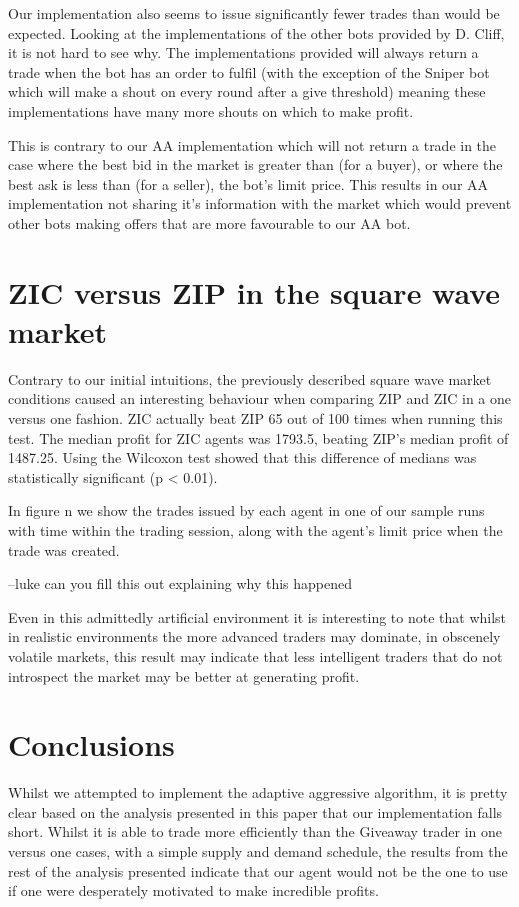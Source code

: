 \documentclass{acm_proc_article-sp}
\begin{document}
Our implementation also seems to issue significantly fewer trades than would be
expected. Looking at the implementations of the other bots provided by D.
Cliff, it is not hard to see why. The implementations provided will always
return a trade when the bot has an order to fulfil (with the exception of the
Sniper bot which will make a shout on every round after a give threshold)
meaning these implementations have many more shouts on which to make profit.

This is contrary to our AA implementation which will not return a trade in the
case where the best bid in the market is greater than (for a buyer), or where
the best ask is less than (for a seller), the bot's limit price. This results
in our AA implementation not sharing it's information with the market which
would prevent other bots making offers that are more favourable to our AA bot.

\section{ZIC versus ZIP in the square wave market}

Contrary to our initial intuitions, the previously described square wave market
conditions caused an interesting behaviour when comparing ZIP and ZIC in a one
versus one fashion. ZIC actually beat ZIP 65 out of 100 times when running this
test. The median profit for ZIC agents was 1793.5, beating ZIP's median profit
of 1487.25. Using the Wilcoxon test showed that this difference of medians was
statistically significant (p < 0.01).

In figure n we show the trades issued by each agent in one of our sample runs
with time within the trading session, along with the agent's limit price when
the trade was created.

--luke can you fill this out explaining why this happened

Even in this admittedly artificial environment it is interesting to note that
whilst in realistic environments the more advanced traders may dominate, in
obscenely volatile markets, this result may indicate that less intelligent
traders that do not introspect the market may be better at generating profit.

\section{Conclusions}

Whilst we attempted to implement the adaptive aggressive algorithm, it is
pretty clear based on the analysis presented in this paper that our
implementation falls short. Whilst it is able to trade more efficiently than
the Giveaway trader in one versus one cases, with a simple supply and demand
schedule, the results from the rest of the analysis presented indicate that our
agent would not be the one to use if one were desperately motivated to make
incredible profits.
\end{document}
